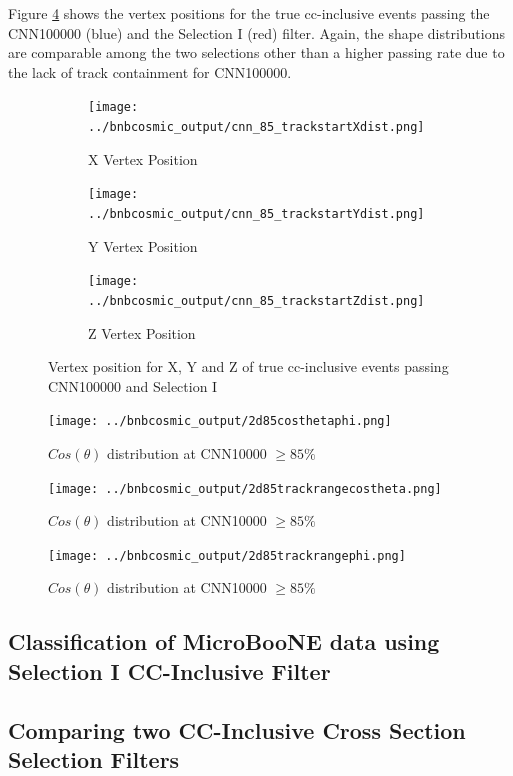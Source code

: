 Figure \ref{fig:vertex} shows the vertex positions for the true cc-inclusive events passing the CNN100000 (blue) and the Selection I (red) filter. Again, the shape distributions are comparable among the two selections other than a higher passing rate due to the lack of track containment for CNN100000.  
\begin{figure}[htp!]
\centering
	\begin{subfigure}[b]{.55\textwidth}
	\centering
		\texttt{[image: ../bnbcosmic\_output/cnn\_85\_trackstartXdist.png]}
		\caption{X Vertex Position} 
		\label{fig:cnn85vertexX}
	\end{subfigure}
	\quad
	\begin{subfigure}[b]{.55\textwidth}
	\centering
		\texttt{[image: ../bnbcosmic\_output/cnn\_85\_trackstartYdist.png]}
		\caption{Y Vertex Position} 
		\label{fig:cnn85vertexY}
	\end{subfigure}
	\quad
	\begin{subfigure}[b]{.55\textwidth}
	\centering
		\texttt{[image: ../bnbcosmic\_output/cnn\_85\_trackstartZdist.png]}
		\caption{Z Vertex Position} 
		\label{fig:cnn85vertexZ}
	\end{subfigure}
\caption{Vertex position for X, Y and Z of true cc-inclusive events passing CNN100000 and Selection I}
\label{fig:vertex}
\end{figure}


\begin{figure}[htp!]
\centering
\texttt{[image: ../bnbcosmic\_output/2d85costhetaphi.png]}
\caption{$Cos(\theta)$ distribution at CNN10000 $\geq 85\%$} 
\label{fig:2d85costhetaphi}
\end{figure}

\begin{figure}[htp!]
\centering
\texttt{[image: ../bnbcosmic\_output/2d85trackrangecostheta.png]}
\caption{$Cos(\theta)$ distribution at CNN10000 $\geq 85\%$} 
\label{fig:2d85trackrangecostheta}
\end{figure}

\begin{figure}[htp!]
\centering
\texttt{[image: ../bnbcosmic\_output/2d85trackrangephi.png]}
\caption{$Cos(\theta)$ distribution at CNN10000 $\geq 85\%$} 
\label{fig:2d85trackrangephi}
\end{figure}
\subsection{Classification of MicroBooNE data using Selection I CC-Inclusive Filter}
\subsection{Comparing two CC-Inclusive Cross Section Selection Filters}
